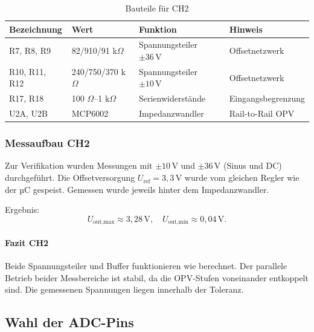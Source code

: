 \documentclass{article}
\begin{document}
	\begin{table}[H]
		\centering
		\caption{Bauteile für CH2}
		\begin{tabular}{llll}
			\toprule
			Bezeichnung & Wert & Funktion & Hinweis \\
			\midrule
			R7, R8, R9    & 82/910/91 k\(\Omega\) & Spannungsteiler \(\pm36\,\mathrm{V}\) & Offsetnetzwerk \\
			R10, R11, R12 & 240/750/370 k\(\Omega\) & Spannungsteiler \(\pm10\,\mathrm{V}\) & Offsetnetzwerk \\
			R17, R18      & 100 \(\Omega\)–1 k\(\Omega\) & Serienwiderstände & Eingangsbegrenzung \\
			U2A, U2B      & MCP6002 & Impedanzwandler & Rail-to-Rail OPV \\
			\bottomrule
		\end{tabular}
	\end{table}
	
	\subsubsection{Messaufbau CH2}
	
	
	Zur Verifikation wurden Messungen mit \(\pm10\,\mathrm{V}\) und \(\pm36\,\mathrm{V}\) (Sinus und DC) durchgeführt.  
	Die Offsetversorgung \(U_\text{ref} = 3{,}3\,\mathrm{V}\) wurde vom gleichen Regler wie der µC gespeist.  
	Gemessen wurde jeweils hinter dem Impedanzwandler.
	
	Ergebnis:
	\[
	U_\text{out,max} \approx 3{,}28\,\mathrm{V}, \quad U_\text{out,min} \approx 0{,}04\,\mathrm{V}.
	\]
	
	\paragraph{Fazit CH2}
	
	Beide Spannungsteiler und Buffer funktionieren wie berechnet.  
	Der parallele Betrieb beider Messbereiche ist stabil, da die OPV-Stufen voneinander entkoppelt sind.  
	Die gemessenen Spannungen liegen innerhalb der Toleranz.
	
	\subsection{Wahl der ADC-Pins}
	
\end{document}
